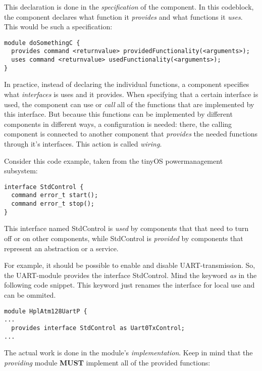 This declaration is done in the \textit{specification} of the component. In this codeblock, the component declares what function it \textit{provides} and what functions it \textit{uses}. This would be such a specification:

\lstset{language=C}
\begin{lstlisting}
module doSomethingC {
  provides command <returnvalue> providedFunctionality(<arguments>);
  uses command <returnvalue> usedFunctionality(<arguments>);
}
\end{lstlisting}

In practice, instead of declaring the individual functions, a component specifies what \textit{interfaces} is uses and it provides. When specifying that a certain interface is used, the component can use or \textit{call} all of the functions that are implemented by this interface. But because this functions can be implemented by different components in different ways, a configuration is needed: there, the calling component is connected to another component that \textit{provides} the needed functions through it's interfaces. This action is called \textit{wiring}.

Consider this code example, taken from the tinyOS powermanagement subsystem:

\lstset{language=C}
\begin{lstlisting}
interface StdControl {
  command error_t start();
  command error_t stop();
}
\end{lstlisting}

This interface named StdControl is \textit{used} by components that that need to turn off or on other components, while StdControl is \textit{provided} by components that represent an abstraction or a service.

For example, it should be possible to enable and disable UART-transmission. So, the UART-module provides the interface StdControl. Mind the keyword \textit{as} in the following code snippet. This keyword just renames the interface for local use and can be ommited.

\lstset{language=C}
\begin{lstlisting}
module HplAtm128UartP {
...
  provides interface StdControl as Uart0TxControl;
...
\end{lstlisting}

The actual work is done in the module's \textit{implementation}. Keep in mind that the \textit{providing} module \textbf{MUST} implement all of the provided functions:

